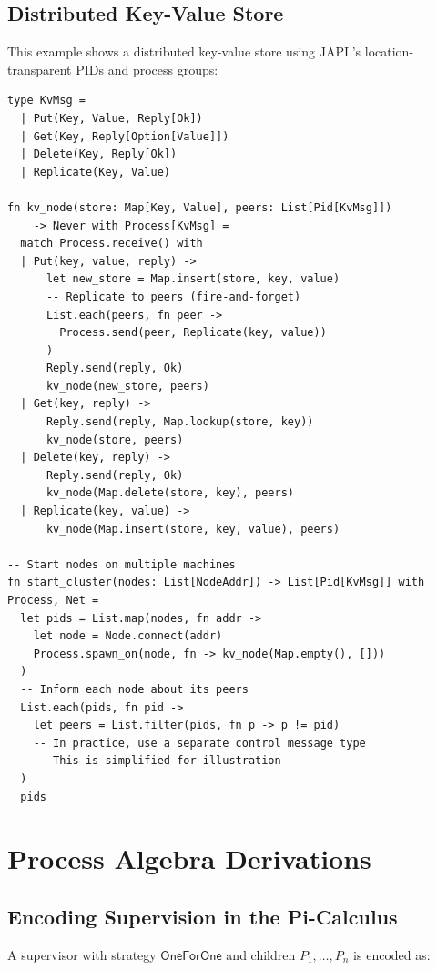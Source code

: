 \documentclass[11pt,a4paper]{article}
\begin{document}
\subsection{Distributed Key-Value Store}

This example shows a distributed key-value store using JAPL's location-transparent PIDs and process groups:

\begin{lstlisting}[language=japl,caption={Distributed key-value store}]
type KvMsg =
  | Put(Key, Value, Reply[Ok])
  | Get(Key, Reply[Option[Value]])
  | Delete(Key, Reply[Ok])
  | Replicate(Key, Value)

fn kv_node(store: Map[Key, Value], peers: List[Pid[KvMsg]])
    -> Never with Process[KvMsg] =
  match Process.receive() with
  | Put(key, value, reply) ->
      let new_store = Map.insert(store, key, value)
      -- Replicate to peers (fire-and-forget)
      List.each(peers, fn peer ->
        Process.send(peer, Replicate(key, value))
      )
      Reply.send(reply, Ok)
      kv_node(new_store, peers)
  | Get(key, reply) ->
      Reply.send(reply, Map.lookup(store, key))
      kv_node(store, peers)
  | Delete(key, reply) ->
      Reply.send(reply, Ok)
      kv_node(Map.delete(store, key), peers)
  | Replicate(key, value) ->
      kv_node(Map.insert(store, key, value), peers)

-- Start nodes on multiple machines
fn start_cluster(nodes: List[NodeAddr]) -> List[Pid[KvMsg]] with Process, Net =
  let pids = List.map(nodes, fn addr ->
    let node = Node.connect(addr)
    Process.spawn_on(node, fn -> kv_node(Map.empty(), []))
  )
  -- Inform each node about its peers
  List.each(pids, fn pid ->
    let peers = List.filter(pids, fn p -> p != pid)
    -- In practice, use a separate control message type
    -- This is simplified for illustration
  )
  pids
\end{lstlisting}

\section{Process Algebra Derivations}\label{app:derivations}

\subsection{Encoding Supervision in the Pi-Calculus}

A supervisor with strategy $\mathsf{OneForOne}$ and children $P_1, \ldots, P_n$ is encoded as:
\end{document}
